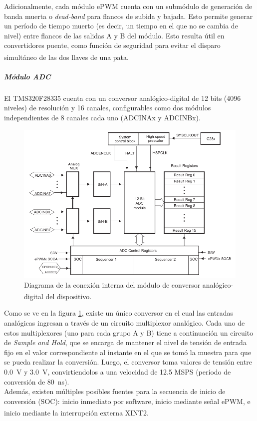 Adicionalmente, cada módulo ePWM cuenta con un submódulo de generación de banda muerta o \textit{dead-band} para flancos de subida y bajada. Esto permite generar un período de tiempo muerto (es decir, un tiempo en el que no se cambia de nivel) entre flancos de las salidas A y B del módulo. Esto resulta útil en convertidores puente, como función de seguridad para evitar el disparo simultáneo de las dos llaves de una pata.\textsuperscript{\cite{DSP-TechManual}}\\

\subparagraph{Módulo ADC}

El TMS320F28335 cuenta con un conversor analógico-digital de 12 bits (4096 niveles) de resolución y 16 canales, configurables como dos módulos independientes de 8 canales cada uno (ADCINAx y ADCINBx).\\

\begin{figure}[h]
    \centering
    \includegraphics[scale=0.35]{Imagenes/Modulo ADC.png}
    \caption{Diagrama de la conexión interna del módulo de conversor analógico-digital del dispositivo.\textsuperscript{\cite{DSP-TechManual}}}
    \label{Modulo-ADC}
\end{figure}

Como se ve en la figura \ref{Modulo-ADC}, existe un único conversor en el cual las entradas analógicas ingresan a través de un circuito multiplexor analógico. Cada uno de estos multiplexores (uno para cada grupo A y B) tiene a continuación un circuito de \textit{Sample and Hold}, que se encarga de mantener el nivel de tensión de entrada fijo en el valor correspondiente al instante en el que se tomó la muestra para que se pueda realizar la conversión. Luego, el conversor toma valores de tensión entre \SI[]{0.0}{\volt} y \SI[]{3.0}{\volt}, convirtiendolos a una velocidad de \num[]{12.5} MSPS (período de conversión de \SI[]{80}{\nano\second}).\\

Además, existen múltiples posibles fuentes para la secuencia de inicio de conversión (SOC): inicio inmediato por software, inicio mediante señal ePWM, e inicio mediante la interrupción externa XINT2.\textsuperscript{\cite{DSP-Datasheet}}\\